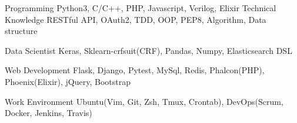 

\begin{cvskills}

  \cvskill
    {Programming} %
    {Python3, C/C++, PHP, Javascript, Verilog, Elixir} %
  \cvskill
    {Technical Knowledge} %
    {RESTful API, OAuth2, TDD, OOP, PEP8, Algorithm, Data structure} %

  \cvskill
    {Data Scientist} %
    {Keras, Sklearn-crfsuit(CRF), Pandas, Numpy, Elasticsearch DSL} %

  \cvskill
    {Web Development} %
    {Flask, Django, Pytest, MySql, Redis, Phalcon(PHP), Phoenix(Elixir), jQuery, Bootstrap} %

  \cvskill
    {Work Environment} %
    {Ubuntu(Vim, Git, Zsh, Tmux, Crontab), DevOps(Scrum, Docker, Jenkins, Travis)} %

\end{cvskills}
